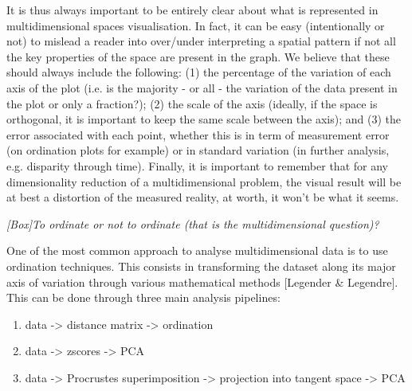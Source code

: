 \documentclass[12pt,letterpaper]{article}
\renewcommand{\subsection}[1]{%
\bigskip
\begin{center}
\begin{large}
\normalfont\itshape #1
\end{large}
\end{center}}
\begin{document}
It is thus always important to be entirely clear about what is represented in multidimensional spaces visualisation.
In fact, it can be easy (intentionally or not) to mislead a reader into over/under interpreting a spatial pattern if not all the key properties of the space are present in the graph.
We believe that these should always include the following:
(1) the percentage of the variation of each axis of the plot (i.e. is the majority - or all - the variation of the data present in the plot or only a fraction?);
(2) the scale of the axis (ideally, if the space is orthogonal, it is important to keep the same scale between the axis);
and (3) the error associated with each point, whether this is in term of measurement error (on ordination plots for example) or in standard variation (in further analysis, e.g. disparity through time).
Finally, it is important to remember that for any dimensionality reduction of a multidimensional problem, the visual result will be at best a distortion of the measured reality, at worth, it won't be what it seems.

\subsection{[Box]To ordinate or not to ordinate (that is the multidimensional question)?}
\label{box_ordination}
One of the most common approach to analyse multidimensional data is to use ordination techniques.
This consists in transforming the dataset along its major axis of variation through various mathematical methods [Legender \& Legendre].
This can be done through three main analysis pipelines:
\begin{enumerate}
    \item data -> distance matrix -> ordination
    \item data -> zscores -> PCA
    \item data -> Procrustes superimposition -> projection into tangent space -> PCA
\end{enumerate}
\end{document}
